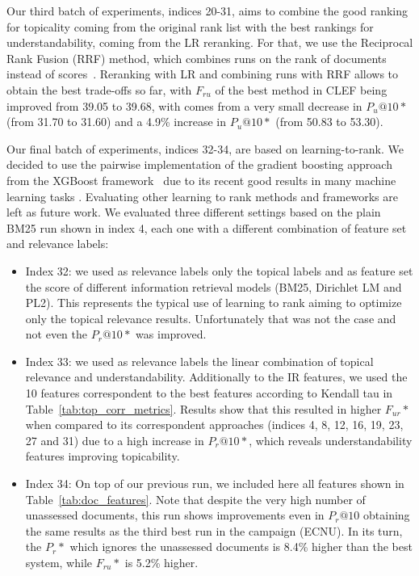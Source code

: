 Our third batch of experiments, indices 20-31, aims to combine the good ranking for topicality coming from the original rank list with the best rankings for understandability, coming from the LR reranking.
For that, we use the Reciprocal Rank Fusion (RRF) method, which combines runs on the rank of documents instead of scores~\cite{cormack09}. Reranking with LR and combining runs with RRF allows to obtain the best trade-offs so far, with $F_{ru}$ of the best method in CLEF being improved from 39.05 to 39.68, with comes from a very small decrease in $P_u@10*$ (from 31.70 to 31.60) and a 4.9\% increase in $P_u@10*$ (from 50.83 to 53.30).

Our final batch of experiments, indices 32-34, are based on learning-to-rank. We decided to use the pairwise implementation of the gradient boosting approach from the XGBoost framework~\cite{chen16} due to its recent good results in many machine learning tasks . Evaluating other learning to rank methods and frameworks are left as future work.
We evaluated three different settings based on the plain BM25 run shown in index 4, each one with a different combination of feature set and relevance labels:
\begin{itemize}
    \item Index 32: we used as relevance labels only the topical labels and as feature set the score of different information retrieval models (BM25, Dirichlet LM and PL2). This represents the typical use of learning to rank aiming to optimize only the topical relevance results. Unfortunately that was not the case and not even the $P_r@10*$ was improved.
    \item Index 33: we used as relevance labels the linear combination of topical relevance and understandability. Additionally to the IR features, we used the 10 features correspondent to the best features according to Kendall tau in Table~\ref{tab:top_corr_metrics}. Results show that this resulted in higher $F_{ur}*$ when compared to its correspondent approaches (indices 4, 8, 12, 16, 19, 23, 27 and 31) due to a high increase in $P_r@10*$, which reveals understandability features improving topicability.
    \item Index 34: On top of our previous run, we included here all features shown in Table~\ref{tab:doc_features}. Note that despite the very high number of unassessed documents, this run shows improvements even in $P_r@10$ obtaining the same results as the third best run in the campaign (ECNU). In its turn, the $P_{r}*$ which ignores the unassessed documents is 8.4\% higher than the best system, while $F_{ru}*$ is 5.2\% higher.
\end{itemize}


